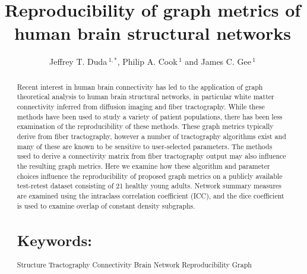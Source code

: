 \documentclass{frontiersSCNS} %
\def\journal{Neurosciences}
\def\firstAuthorLast{Duda {et~al}} %
\def\Authors{Jeffrey T. Duda\,$^{1,*}$, Philip A. Cook\,$^{1}$ and James C. Gee\,$^1$}
\begin{document}
\onecolumn
{}

\title[Reproducibility of structural graph metrics]{Reproducibility of graph metrics of human brain structural networks}
\author[\firstAuthorLast ]{\Authors}
\address{}
\correspondance{}
\editor{}

\maketitle
\begin{abstract}

Recent interest in human brain connectivity has led to the application of
graph theoretical analysis to human brain structural networks, in
particular white matter connectivity inferred from diffusion imaging
and fiber tractography. While these methods have been used to study a
variety of patient populations, there has been less examination of the
reproducibility of these methods. These graph metrics typically derive
from fiber tractography, however a number of tractography algorithms
exist and many of these are known to be sensitive to user-selected
parameters. The methods used to derive a connectivity matrix from
fiber tractography output may also influence the resulting graph
metrics. Here we examine how these algorithm and parameter choices
influence the reproducibility of proposed graph metrics on a publicly
available test-retest dataset consisting of 21 healthy young
adults. Network summary
measures are examined using the intraclass correlation coefficient
(ICC), and the dice coefficient is used to examine overlap 
of constant density subgraphs. 



\tiny
  \section{Keywords:} Structure Tractography Connectivity Brain
  Network Reproducibility Graph  %
\end{abstract}
\end{document}
